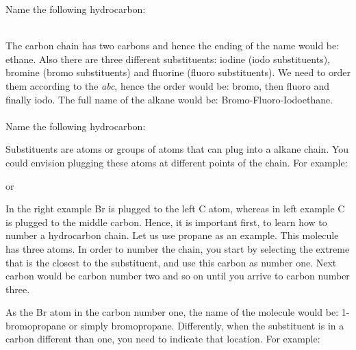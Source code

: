 \documentclass[main.tex]{subfiles}
\begin{document}
\begin{description}
\begin{example} %
Name the following hydrocarbon:
\begin{center} \end{center}
\\
The carbon chain has two carbons and hence the ending of the name would be: ethane. Also there are three different substituents: iodine (iodo substituents), bromine (bromo substituents) and fluorine (fluoro substituents). We need to order them according to the \emph{abc}, hence the order would be: bromo, then fluoro and finally iodo. The full name of the alkane would be: Bromo-Fluoro-Iodoethane.
\\
\faDiamond\ \\
Name the following hydrocarbon:
\begin{center} \end{center}
\end{example}%


\item[\docfilehook{\smallpencil Numbering the chain}{Numbering the chain}] Substituents are atoms or groups of atoms that can plug into a alkane chain. You could envision plugging these atoms at different points of the chain. For example:
\begin{center}  \hspace{0.5cm}or\hspace{0.5cm} \end{center}

In the right example Br is plugged to the left C atom, whereas in left example C is plugged to the middle carbon. Hence, it is important first, to learn how to number a hydrocarbon chain. Let us use propane as an example. This molecule has three atoms. In order to number the chain, you start by selecting the extreme that is the closest to the substituent, and use this carbon as number one. Next carbon would be carbon number two and so on until you arrive to carbon number three. 
\begin{center}\end{center}
As the Br atom in the carbon number one, the name of the molecule would be: 1-bromopropane or simply bromopropane. Differently, when the substituent is in a carbon different than one, you need to indicate that location. For example:


\end{description}
\end{document}
